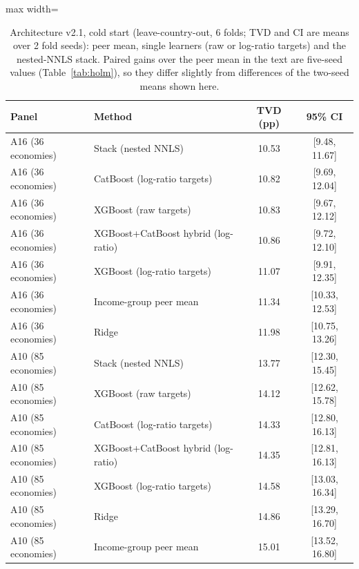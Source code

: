 \begin{table}
\caption{Architecture v2.1, cold start (leave-country-out, 6 folds; TVD and CI are means over 2 fold seeds): peer mean, single learners (raw or log-ratio targets) and the nested-NNLS stack. Paired gains over the peer mean in the text are five-seed values (Table~\ref{tab:holm}), so they differ slightly from differences of the two-seed means shown here.}\label{tab:Ecold}
\centering\small
\renewcommand{\arraystretch}{1.1}
\begin{adjustbox}{max width=\linewidth}
\begin{tabular}{llcc}
\toprule
Panel & Method & TVD (pp) & 95\% CI \\
\midrule
A16 (36 economies) & Stack (nested NNLS) & 10.53 & [9.48, 11.67] \\
A16 (36 economies) & CatBoost (log-ratio targets) & 10.82 & [9.69, 12.04] \\
A16 (36 economies) & XGBoost (raw targets) & 10.83 & [9.67, 12.12] \\
A16 (36 economies) & XGBoost+CatBoost hybrid (log-ratio) & 10.86 & [9.72, 12.10] \\
A16 (36 economies) & XGBoost (log-ratio targets) & 11.07 & [9.91, 12.35] \\
A16 (36 economies) & Income-group peer mean & 11.34 & [10.33, 12.53] \\
A16 (36 economies) & Ridge & 11.98 & [10.75, 13.26] \\
\midrule
A10 (85 economies) & Stack (nested NNLS) & 13.77 & [12.30, 15.45] \\
A10 (85 economies) & XGBoost (raw targets) & 14.12 & [12.62, 15.78] \\
A10 (85 economies) & CatBoost (log-ratio targets) & 14.33 & [12.80, 16.13] \\
A10 (85 economies) & XGBoost+CatBoost hybrid (log-ratio) & 14.35 & [12.81, 16.13] \\
A10 (85 economies) & XGBoost (log-ratio targets) & 14.58 & [13.03, 16.34] \\
A10 (85 economies) & Ridge & 14.86 & [13.29, 16.70] \\
A10 (85 economies) & Income-group peer mean & 15.01 & [13.52, 16.80] \\
\bottomrule
\end{tabular}\end{adjustbox}
\end{table}
